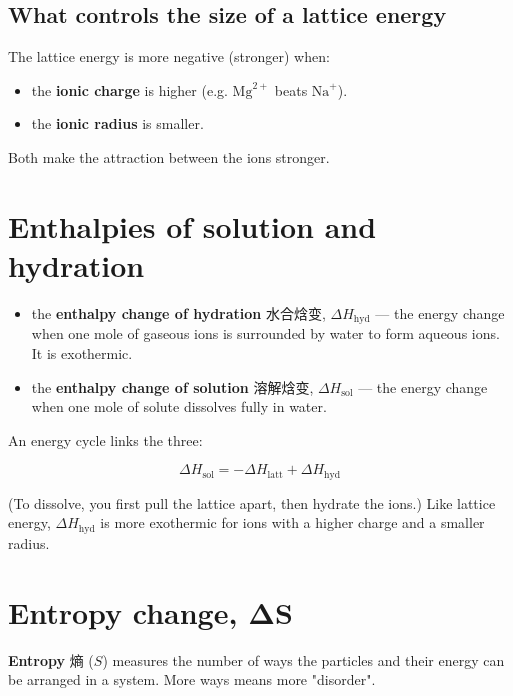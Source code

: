 \documentclass[11pt]{article}
\begin{document}
\subsection*{What controls the size of a lattice energy}

The lattice energy is more negative (stronger) when:

\begin{itemize}
\item the \textbf{ionic charge} is higher (e.g. $\text{Mg}^{2+}$ beats $\text{Na}^+$).

\item the \textbf{ionic radius} is smaller.

\end{itemize}

Both make the attraction between the ions stronger.

\section*{Enthalpies of solution and hydration}

\begin{itemize}
\item the \textbf{enthalpy change of hydration} 水合焓变, $\Delta H_{\text{hyd}}$ — the energy change when one mole of gaseous ions is surrounded by water to form aqueous ions. It is exothermic.

\item the \textbf{enthalpy change of solution} 溶解焓变, $\Delta H_{\text{sol}}$ — the energy change when one mole of solute dissolves fully in water.

\end{itemize}

An energy cycle links the three:

\[
\Delta H_{\text{sol}} = -\Delta H_{\text{latt}} + \Delta H_{\text{hyd}}
\]

(To dissolve, you first pull the lattice apart, then hydrate the ions.) Like lattice energy, $\Delta H_{\text{hyd}}$ is more exothermic for ions with a higher charge and a smaller radius.

\section*{Entropy change, ΔS}

\textbf{Entropy} 熵 ($S$) measures the number of ways the particles and their energy can be arranged in a system. More ways means more "disorder".
\end{document}
